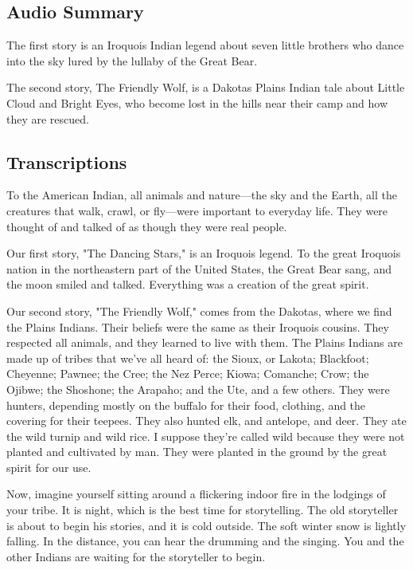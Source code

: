 \subsection{Audio Summary}

The first story is an Iroquois Indian legend about seven little brothers who dance into the sky lured by the lullaby of the Great Bear.

The second story, The Friendly Wolf, is a Dakotas Plains Indian tale about Little Cloud and Bright Eyes, who become lost in the hills near their camp and how they are rescued.

\subsection{Transcriptions}

To the American Indian, all animals and nature—the sky and the Earth, all the creatures that walk, crawl, or fly—were important to everyday life. They were thought of and talked of as though they were real people.

Our first story, "The Dancing Stars," is an Iroquois legend. To the great Iroquois nation in the northeastern part of the United States, the Great Bear sang, and the moon smiled and talked. Everything was a creation of the great spirit.

Our second story, "The Friendly Wolf," comes from the Dakotas, where we find the Plains Indians. Their beliefs were the same as their Iroquois cousins. They respected all animals, and they learned to live with them. The Plains Indians are made up of tribes that we've all heard of: the Sioux, or Lakota; Blackfoot; Cheyenne; Pawnee; the Cree; the Nez Perce; Kiowa; Comanche; Crow; the Ojibwe; the Shoshone; the Arapaho; and the Ute, and a few others. They were hunters, depending mostly on the buffalo for their food, clothing, and the covering for their teepees. They also hunted elk, and antelope, and deer. They ate the wild turnip and wild rice. I suppose they're called wild because they were not planted and cultivated by man. They were planted in the ground by the great spirit for our use.

Now, imagine yourself sitting around a flickering indoor fire in the lodgings of your tribe. It is night, which is the best time for storytelling. The old storyteller is about to begin his stories, and it is cold outside. The soft winter snow is lightly falling. In the distance, you can hear the drumming and the singing. You and the other Indians are waiting for the storyteller to begin.

